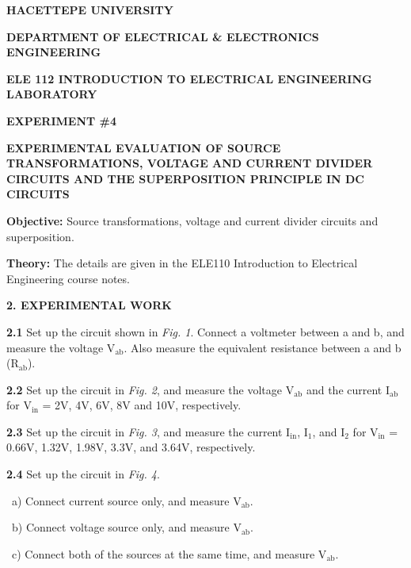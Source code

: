 \documentclass{article}
\begin{document}
\large

{\small \textbf{HACETTEPE UNIVERSITY}}

{\small \textbf{DEPARTMENT OF ELECTRICAL \& ELECTRONICS ENGINEERING}} 

{\small \textbf{ELE 112 INTRODUCTION TO ELECTRICAL ENGINEERING LABORATORY}} 

\vspace{4mm}

{\small \textbf{EXPERIMENT \#4}}

\vspace{4mm}

{\small \textbf{EXPERIMENTAL EVALUATION OF SOURCE TRANSFORMATIONS, VOLTAGE AND CURRENT DIVIDER CIRCUITS AND THE SUPERPOSITION PRINCIPLE IN DC CIRCUITS}}

\vspace{4mm}

{\textbf{Objective:}}
{Source transformations, voltage and current divider circuits and superposition.}

\vspace{4mm}

{\textbf{Theory:}}
{The details are given in the ELE110 Introduction to Electrical Engineering course notes.}

\vspace{4mm}

{\Large \textbf{2. EXPERIMENTAL WORK}}

\vspace{4mm}

{\textbf{2.1} Set up the circuit shown in \textit{Fig. 1}. Connect a voltmeter between a and b, and measure the voltage V$_\text{ab}$. Also measure the equivalent resistance between a and b (R$_\text{ab}$).}

\vspace{4mm}

{\textbf{2.2} Set up the circuit in \textit{Fig. 2}, and measure the voltage V$_\text{ab}$ and the current I$_\text{ab}$ for V$_\text{in}$ = 2V, 4V, 6V, 8V and 10V, respectively.}

\vspace{4mm}

{\textbf{2.3} Set up the circuit in \textit{Fig. 3}, and measure the current I$_\text{in}$,   I$_1$, and I$_2$ for V$_\text{in}$ = 0.66V, 1.32V, 1.98V, 3.3V, and 3.64V, respectively.}

\vspace{4mm}

{\textbf{2.4} Set up the circuit in \textit{Fig. 4}.

\ a) Connect current source only, and measure V$_\text{ab}$.

\ b) Connect voltage source only, and measure V$_\text{ab}$.

\ c) Connect both of the sources at the same time, and measure  V$_\text{ab}$.}
\end{document}
